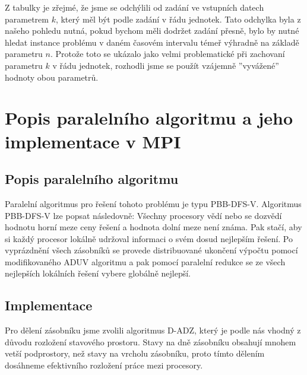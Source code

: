 \documentclass[12pt]{article}
\begin{document}
Z tabulky je zřejmé, že jsme se odchýlili od zadání ve vstupních datech parametrem $k$, který měl být podle zadání v řádu jednotek.
Tato odchylka byla z našeho pohledu nutná, pokud bychom měli dodržet zadání přesně, bylo by nutné hledat instance problému
v daném časovém intervalu témeř výhradně na základě parametru $n$. Protože toto se ukázalo jako velmi problematické při zachovaní 
parametru $k$ v řádu jednotek, rozhodli jsme se použít vzájemně ''vyvážené'' hodnoty obou parametrů.



\section{Popis paralelního algoritmu a jeho implementace v MPI}

\subsection{Popis paralelního algoritmu}

Paralelní algoritmus pro řešení tohoto problému je typu PBB-DFS-V. 
Algoritmus PBB-DFS-V lze popsat následovně: 
Všechny procesory vědí nebo se dozvědí hodnotu horní meze ceny řešení a hodnota dolní meze není známa. 
Pak stačí, aby si každý procesor lokálně udržoval informaci o svém dosud nejlepším řešení. 
Po vyprázdnění všech zásobníků se provede distribuované ukončení výpočtu pomocí modifikovaného ADUV algoritmu a 
pak pomocí paralelní redukce se ze všech nejlepších lokálních řešení vybere globálně nejlepší. 

\subsection{Implementace}

Pro dělení zásobníku jsme zvolili algoritmus D-ADZ, který je podle nás vhodný z důvodu
rozložení stavového prostoru. Stavy na dně zásobníku obsahují mnohem vetší podprostory, než stavy
na vrcholu zásobníku, proto tímto dělením dosáhneme efektivního rozložení práce mezi procesory.
\end{document}
